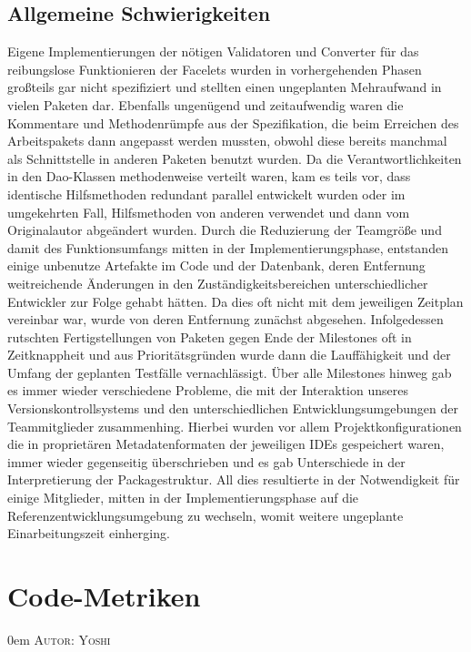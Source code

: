 \documentclass{article}
\makeatletter
\newcommand{\sectionauthor}[1]{
	{\parindent 0em \large \scshape Autor: #1 \par \nobreak \vspace*{1em}}
	\@afterheading
}
\makeatother
\begin{document}
\subsection{Allgemeine Schwierigkeiten}
Eigene Implementierungen der nötigen Validatoren und Converter für das reibungslose Funktionieren der Facelets wurden in vorhergehenden Phasen großteils gar nicht spezifiziert und stellten einen ungeplanten Mehraufwand in vielen Paketen dar. Ebenfalls ungenügend und zeitaufwendig waren die Kommentare und Methodenrümpfe aus der Spezifikation, die beim Erreichen des Arbeitspakets dann angepasst werden mussten, obwohl diese bereits manchmal als Schnittstelle in anderen Paketen benutzt wurden. Da die Verantwortlichkeiten in den Dao-Klassen methodenweise verteilt waren, kam es teils vor, dass identische Hilfsmethoden redundant parallel entwickelt wurden oder im umgekehrten Fall, Hilfsmethoden von anderen verwendet und dann vom Originalautor abgeändert wurden. Durch die Reduzierung der Teamgröße und damit des Funktionsumfangs mitten in der Implementierungsphase, entstanden einige unbenutze Artefakte im Code und der Datenbank, deren Entfernung weitreichende Änderungen in den Zuständigkeitsbereichen unterschiedlicher Entwickler zur Folge gehabt hätten. Da dies oft nicht mit dem jeweiligen Zeitplan vereinbar war, wurde von deren Entfernung zunächst abgesehen. Infolgedessen rutschten Fertigstellungen von Paketen gegen Ende der Milestones oft in Zeitknappheit und aus Prioritätsgründen wurde dann die Lauffähigkeit und der Umfang der geplanten Testfälle vernachlässigt. Über alle Milestones hinweg gab es immer wieder verschiedene Probleme, die mit der Interaktion unseres Versionskontrollsystems und den unterschiedlichen Entwicklungsumgebungen der Teammitglieder zusammenhing. Hierbei wurden vor allem Projektkonfigurationen die in proprietären Metadatenformaten der jeweiligen IDEs gespeichert waren, immer wieder gegenseitig überschrieben und es gab Unterschiede in der Interpretierung der Packagestruktur. All dies resultierte in der Notwendigkeit für einige Mitglieder, mitten in der Implementierungsphase auf die Referenzentwicklungsumgebung zu wechseln, womit weitere ungeplante Einarbeitungszeit einherging.

\section{Code-Metriken}
\sectionauthor{Yoshi}
\end{document}
